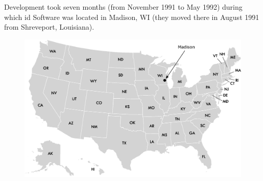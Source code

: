 \documentclass[book.tex]{subfiles}
\begin{document}
Development took seven months (from November 1991 to May 1992) during which id Software was located in Madison, WI (they moved there in August 1991 from Shreveport, Louisiana).
\begin{figure}[H]
\centering
 \includegraphics[width=\textwidth]{imgs/drawings/map/usa-id-software.eps}
 \end{figure}
\end{document}
